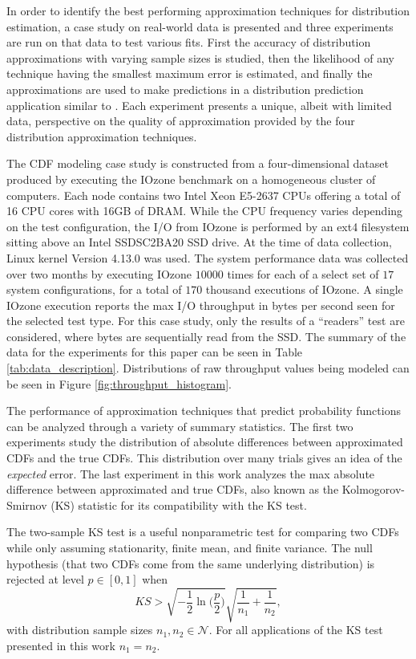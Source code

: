 \documentclass[letterpaper, 10 pt, conference]{ieeeconf}  %
\begin{document}
In order to identify the best performing approximation techniques for distribution estimation, a case study on real-world data is presented and three experiments are run on that data to test various fits. First the accuracy of distribution approximations with varying sample sizes is studied, then the likelihood of any technique having the smallest maximum error is estimated, and finally the approximations are used to make predictions in a distribution prediction application similar to \cite{lux2018nonparametric}. Each experiment presents a unique, albeit with limited data, perspective on the quality of approximation provided by the four distribution approximation techniques.

The CDF modeling case study is constructed from a four-dimensional dataset produced by executing the IOzone benchmark \cite{iozone} on a homogeneous cluster of computers. Each node contains two Intel Xeon E5-2637 CPUs offering a total of 16 CPU cores with 16GB of DRAM. While the CPU frequency varies depending on the test configuration, the I/O from IOzone is performed by an ext4 filesystem sitting above an Intel SSDSC2BA20 SSD drive. At the time of data collection, Linux kernel Version 4.13.0 was used. The system performance data was collected over two months by executing IOzone  $10000$ times for each of a select set of $17$ system configurations, for a total of $170$ thousand executions of IOzone. A single IOzone execution reports the max I/O throughput in bytes per second seen for the selected test type. For this case study, only the results of a ``readers'' test are considered, where bytes are sequentially read from the SSD. The summary of the data for the experiments for this paper can be seen in Table \ref{tab:data_description}. Distributions of raw throughput values being modeled can be seen in Figure \ref{fig:throughput_histogram}.


The performance of approximation techniques that predict probability functions can be analyzed through a variety of summary statistics. The first two experiments study the distribution of absolute differences between approximated CDFs and the true CDFs. This distribution over many trials gives an idea of the \textit{expected} error. The last experiment in this work analyzes the max absolute difference between approximated and true CDFs, also known as the Kolmogorov-Smirnov (KS) statistic \cite{lilliefors1967kolmogorov} for its compatibility with the KS test.

The two-sample KS test is a useful nonparametric test for comparing two CDFs while only assuming stationarity, finite mean, and finite variance. The null hypothesis (that two CDFs come from the same underlying distribution) is rejected at level $p \in [0,1]$ when
 $$ KS > \sqrt{-\frac{1}{2}\ln\biggl(\frac{p}{2}\biggr)} \sqrt{\frac{1}{n_1} + \frac{1}{n_2}}, $$
with distribution sample sizes $n_1,n_2 \in \mathcal{N}$. For all applications of the KS test presented in this work $n_1 = n_2$.
\end{document}
